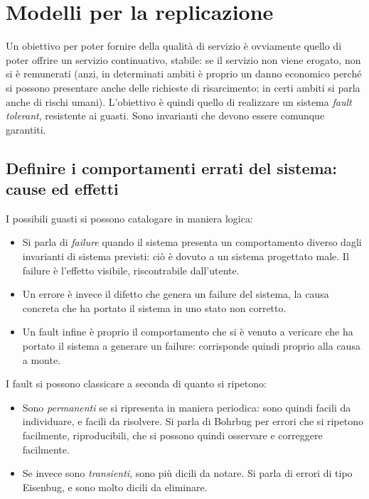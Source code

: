\section{Modelli per la replicazione}
Un obiettivo per poter fornire della qualità di servizio è ovviamente quello di poter offrire un servizio continuativo,
stabile: se il servizio non viene erogato, non si è remunerati (anzi, in determinati ambiti è proprio un danno economico
perché si possono presentare anche delle richieste di risarcimento; in certi ambiti si parla anche di rischi umani).
L'obiettivo è quindi quello di realizzare un sistema \textit{fault tolerant}, resistente ai guasti. Sono invarianti che
devono essere comunque garantiti.
\subsection{Definire i comportamenti errati del sistema: cause ed effetti}
I possibili guasti si possono catalogare in maniera logica:
\begin{itemize}
 \item Si parla di \textit{failure} quando il sistema presenta un comportamento diverso dagli invarianti di sistema
previsti: ciò è dovuto a un sistema progettato male. Il failure è l'effetto visibile, riscontrabile dall'utente.
 \item Un errore è invece il difetto che genera un failure del sistema, la causa concreta che ha portato il sistema 
 in uno stato non corretto.
 \item Un fault infine è proprio il comportamento che si è venuto a vericare che ha portato il sistema a generare un
 failure: corrisponde quindi proprio alla causa a monte.
\end{itemize}
I fault si possono classicare a seconda di quanto si ripetono:
\begin{itemize}
 \item Sono \textit{permanenti} se si ripresenta in maniera periodica: sono quindi facili da individuare, e facili da
 risolvere. Si parla di Bohrbug per errori che si ripetono facilmente, riproducibili, che si possono quindi osservare
 e correggere facilmente.
 \item Se invece sono \textit{transienti}, sono più dicili da notare. Si parla di errori di tipo Eisenbug, e sono molto
 dicili da eliminare.
\end{itemize}

